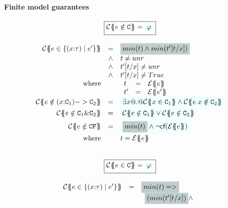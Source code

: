 \paragraph{Finite model guarantees} 

\begin{figure}\small
\setlength{\arraycolsep}{2pt}
\[\begin{array}{c} 
\ruleform{\ctrans{\Sigma}{\Gamma}{e \notin \Ct} = \formula{\phi}} \\ \\
\begin{array}{rcl}
\ctrans{\Sigma}{\Gamma}{e \in \{(x{:}\tau) \mid e' \}}
  & = & \highlight{min(t) \land min(t'[t/x])} \\ 
  & \land & t \neq \unr \\ 
  & \land & t'[t/x] \neq \unr \\ 
  & \land & t'[t/x] \neq True \\ 
 \mbox{where} &  & 
    \begin{array}[t]{lcl}
      t  & = & \etrans{\Sigma}{\Gamma}{e} \\
      t' & = & \etrans{\Sigma}{\Gamma}{e'}
    \end{array}
\\
\ctrans{\Sigma}{\Gamma}{e \notin (x{:}\Ct_1) -> \Ct_2}
  & = & \formula{\exists x @.@ \ctrans{\Sigma}{\Gamma,x}{x \in \Ct_1} 
                          \land \ctrans{\Sigma}{\Gamma,x}{e\;x \notin \Ct_2}}
\\
\ctrans{\Sigma}{\Gamma}{e \notin \Ct_1 \& \Ct_2}
   & = & \formula{ \ctrans{\Sigma}{\Gamma}{e \notin \Ct_1} \lor 
                   \ctrans{\Sigma}{\Gamma}{e \notin \Ct_2}}
\\
\ctrans{\Sigma}{\Gamma}{e \notin \CF} & = & \formula{\highlight{min(t)} \land
                                               \neg\lcf{\etrans{\Sigma}{\Gamma}{e}}} \\ 
\mbox{where}  &  & t = \etrans{\Sigma}{\Gamma}{e} \\ \\ 
\end{array} \\ \\ 
\ruleform{\ctrans{\Sigma}{\Gamma}{e \in \Ct} = \formula{\phi}} \\ \\
\begin{array}{rcl}
\ctrans{\Sigma}{\Gamma}{e \in \{(x{:}\tau) \mid e' \}}
  & = & \highlight{min(t) => }  \\ 
  &   & \begin{array}[t]{l} \highlight{(min(t'[t/x])} \land \\

\end{array}
\end{array}
\end{array}\]
\end{figure}
